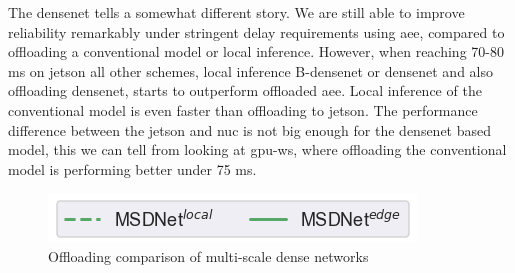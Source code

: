 The \gls{densenet} tells a somewhat different story. We are still able to improve reliability remarkably under stringent delay requirements using \gls{aee}, compared to offloading a conventional model or local inference. However, when reaching 70-80 ms on \gls{jetson} all other schemes, local inference B-\gls{densenet} or \gls{densenet} and also offloading \gls{densenet}, starts to outperform offloaded \gls{aee}. Local inference of the conventional model is even faster than offloading to \gls{jetson}. The performance difference between the \gls{jetson} and \gls{nuc} is not big enough for the \gls{densenet} based model, this we can tell from looking at \gls{gpu-ws}, where offloading the conventional model is performing better under 75 ms. 

\begin{figure}
	\captionsetup[subfigure]{justification=centering, farskip=0pt,captionskip=0pt}
	\centering
	\includegraphics[width=.3\linewidth]{figures/edge/gpu_msdnet_offloading_vs_local_legend}
	\hfill
	\hfill
	\caption[Offloading comparison of multi-scale dense networks]{Offloading comparison of multi-scale dense networks}
	\label{fig:msdnet-offloading-vs-local}
\end{figure}

